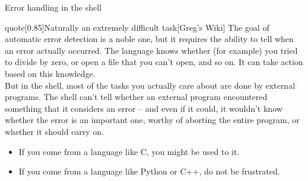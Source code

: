 
\begin{frame}{Error handling in the shell}
    \vspace{-2mm}
    \begin{varblock}{quote}[0.85\textwidth]{Naturally an extremely difficult task}[Greg's Wiki]
        The goal of automatic error detection is a noble one, but it requires the ability to tell when an error actually occurred.
        The language knows whether (for example) you tried to divide by zero, or open a file that you can't open, and so on.
        It can take action based on this knowledge.\\[2mm]
        But in the shell, most of the tasks you actually care about are done by external programs.
        \alert{The shell can't tell whether an external program encountered something that it considers an error} -- and even if it could, it wouldn't know whether the error is an important one, worthy of aborting the entire program, or whether it should carry on.
    \end{varblock}
    \begin{itemize}
        \item If you come from a language like C, you might be used to it.
        \item If you come from a language like Python or C++, do not be frustrated.
    \end{itemize}
\end{frame}

